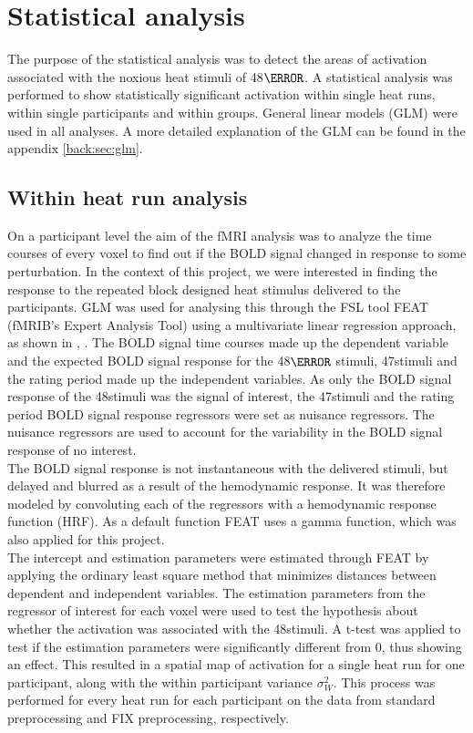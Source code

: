 \section{Statistical analysis}
The purpose of the statistical analysis was to detect the areas of activation associated with the noxious heat stimuli of 48$\degree$. A statistical analysis was performed to show statistically significant activation within single heat runs, within single participants and within groups. General linear models (GLM) were used in all analyses. A more detailed explanation of the GLM can be found in the appendix \ref{back:sec:glm}. 

\subsection{Within heat run analysis}
On a participant level the aim of the fMRI analysis was to analyze the time courses of every voxel to find out if the BOLD signal changed in response to some perturbation. In the context of this project, we were interested in finding the response to the repeated block designed heat stimulus delivered to the participants. GLM was used for analysing this through the FSL tool FEAT (fMRIB’s Expert Analysis Tool) using a multivariate linear regression approach, as shown in , . The BOLD signal time courses made up the dependent variable and the expected BOLD signal response for the 48$\degree$ stimuli, 47\degree stimuli and the rating period made up the independent variables. As only the BOLD signal response of the 48\degree stimuli was the signal of interest, the 47\degree stimuli and the rating period BOLD signal response regressors were set as nuisance regressors. The nuisance regressors are used to account for the variability in the BOLD signal response of no interest. \\
The BOLD signal response is not instantaneous with the delivered stimuli, but delayed and blurred as a result of the hemodynamic response. It was therefore modeled by convoluting each of the regressors with a hemodynamic response function (HRF). As a default function FEAT uses a gamma function, which was also applied for this project. \\
The intercept and estimation parameters were estimated through FEAT by applying the ordinary least square method that minimizes distances between dependent and independent variables. The estimation parameters from the regressor of interest for each voxel were used to test the hypothesis about whether the activation was associated with the 48\degree stimuli. A t-test was applied to test if the estimation parameters were significantly different from 0, thus showing an effect. This resulted in a spatial map of activation for a single heat run for one participant, along with the within participant variance $\sigma_{W}^{2}$. This process was performed for every heat run for each participant on the data from standard preprocessing and FIX preprocessing, respectively. \\

